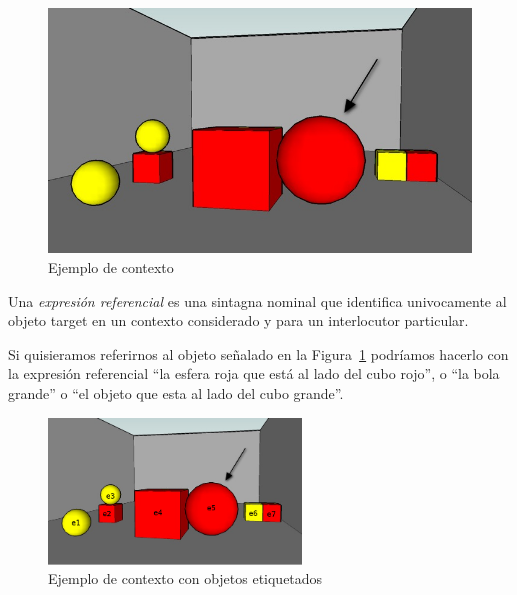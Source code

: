  
\begin{figure}[ht]
\centering
\includegraphics[scale=.4]{images/22sinletras.jpg}
\caption{Ejemplo de contexto}
\label{GRE3D7-stimulus1}

\end{figure}

%

Una \emph{expresi\'on referencial} es una sintagna nominal que identifica univocamente al objeto target en un contexto considerado y para un interlocutor particular.

Si quisieramos referirnos al objeto se\~nalado en la Figura~\ref{GRE3D7-stimulus1} podr\'iamos hacerlo con la expresi\'on referencial ``la
esfera roja que est\'a al lado del cubo rojo'', o ``la bola grande'' o ``el objeto que esta al lado del cubo grande''. 

\begin{figure}[ht]
\centering
\includegraphics[width=0.6\textwidth]{images/22.jpg}
\caption{Ejemplo de contexto con objetos etiquetados}
\label{GRE3D7-stimulus2}
\end{figure}

